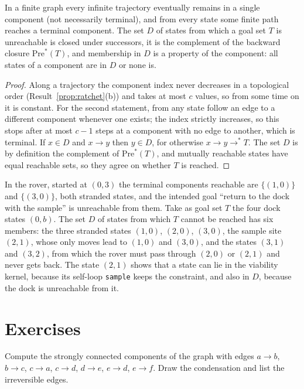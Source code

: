 \begin{newresult}\label{prop:terminal}
In a finite graph every infinite trajectory eventually remains in a single component (not necessarily terminal), and from every state some finite path reaches a terminal component. The set $D$ of states from which a goal set $T$ is unreachable is closed under successors, it is the complement of the backward closure $\mathrm{Pre}^*(T)$, and membership in $D$ is a property of the component: all states of a component are in $D$ or none is.
\end{newresult}
\begin{proof}
Along a trajectory the component index never decreases in a topological order (Result~\ref{prop:ratchet}(b)) and takes at most $c$ values, so from some time on it is constant. For the second statement, from any state follow an edge to a different component whenever one exists; the index strictly increases, so this stops after at most $c-1$ steps at a component with no edge to another, which is terminal. If $x\in D$ and $x\to y$ then $y\in D$, for otherwise $x\to y\to^{*}T$. The set $D$ is by definition the complement of $\mathrm{Pre}^*(T)$, and mutually reachable states have equal reachable sets, so they agree on whether $T$ is reached.
\end{proof}

In the rover, started at $(0,3)$ the terminal components reachable are $\{(1,0)\}$ and $\{(3,0)\}$, both stranded states, and the intended goal ``return to the dock with the sample'' is unreachable from them. Take as goal set $T$ the four dock states $(0,b)$. The set $D$ of states from which $T$ cannot be reached has six members: the three stranded states $(1,0)$, $(2,0)$, $(3,0)$, the sample site $(2,1)$, whose only moves lead to $(1,0)$ and $(3,0)$, and the states $(3,1)$ and $(3,2)$, from which the rover must pass through $(2,0)$ or $(2,1)$ and never gets back. The state $(2,1)$ shows that a state can lie in the viability kernel, because its self-loop \texttt{sample} keeps the constraint, and also in $D$, because the dock is unreachable from it.

\section*{Exercises}

\begin{exercise}
Compute the strongly connected components of the graph with edges $a\to b$, $b\to c$, $c\to a$, $c\to d$, $d\to e$, $e\to d$, $e\to f$. Draw the condensation and list the irreversible edges.
\end{exercise}

